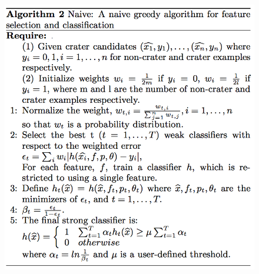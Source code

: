 \documentclass[conference]{IEEEtran}
\begin{document}
\begin{figure}[!htb]
\begin{center}
\includegraphics[scale=0.34]{naive.png}
\label{default}
\end{center}
\end{figure}
\end{document}
